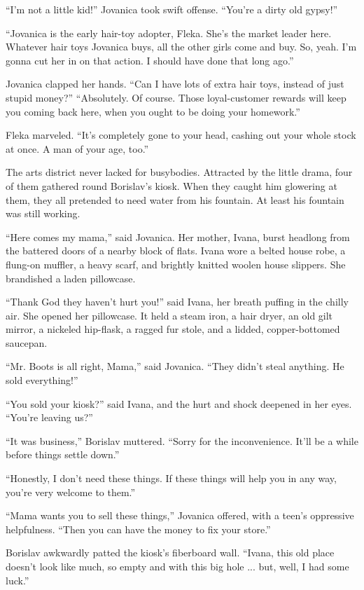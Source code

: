 \documentclass[20 pt,twoside,extrafontsizes,final]{memoir}
\begin{document}
``I'm not a little kid!'' Jovanica took swift offense. ``You're a dirty old gypsy!''

``Jovanica is the early hair-toy adopter, Fleka. She's the market leader here. Whatever hair toys Jovanica buys, all the other girls come and buy. So, yeah. I'm gonna cut her in on that action. I should have done that long ago.''

Jovanica clapped her hands. ``Can I have lots of extra hair toys, instead of just stupid money?''
``Absolutely. Of course. Those loyal-customer rewards will keep you coming back here, when you ought to be doing your homework.''

Fleka marveled. ``It's completely gone to your head, cashing out your whole stock at once. A man of your age, too.''

The arts district never lacked for busybodies. Attracted by the little drama, four of them gathered round Borislav's kiosk. When they caught him glowering at them, they all pretended to need water from his fountain. At least his fountain was still working.

``Here comes my mama,'' said Jovanica. Her mother, Ivana, burst headlong from the battered doors of a nearby block of flats. Ivana wore a belted house robe, a flung-on muffler, a heavy scarf, and brightly knitted woolen house slippers. She brandished a laden pillowcase.

``Thank God they haven't hurt you!'' said Ivana, her breath puffing in the chilly air. She opened her pillowcase. It held a steam iron, a hair dryer, an old gilt mirror, a nickeled hip-flask, a ragged fur stole, and a lidded, copper-bottomed saucepan.

``Mr. Boots is all right, Mama,'' said Jovanica. ``They didn't steal anything. He sold everything!''

``You sold your kiosk?'' said Ivana, and the hurt and shock deepened in her eyes. ``You're leaving us?''

``It was business,'' Borislav muttered. ``Sorry for the inconvenience. It'll be a while before things settle down.''

``Honestly, I don't need these things. If these things will help you in any way, you're very welcome to them.''

``Mama wants you to sell these things,'' Jovanica offered, with a teen's oppressive helpfulness. ``Then you can have the money to fix your store.''

Borislav awkwardly patted the kiosk's fiberboard wall. ``Ivana, this old place doesn't look like much, so empty and with this big hole ... but, well, I had some luck.''
\end{document}

